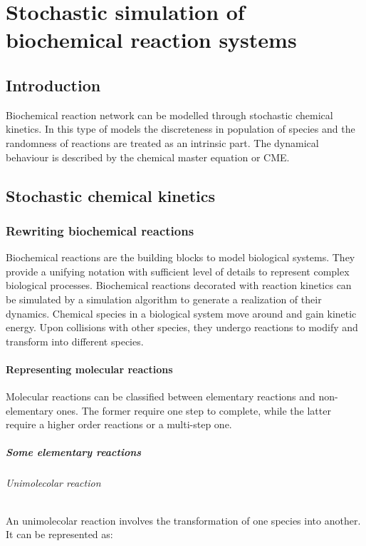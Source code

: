 \graphicspath{{chapters/02/images/}}
\chapter{Stochastic simulation of biochemical reaction systems}

\section{Introduction}
Biochemical reaction network can be modelled through stochastic chemical kinetics.
In this type of models the discreteness in population of species and the randomness of reactions are treated as an intrinsic part.
The dynamical behaviour is described by the chemical master equation or CME.

\section{Stochastic chemical kinetics}

  \subsection{Rewriting biochemical reactions}
  Biochemical reactions are the building blocks to model biological systems.
  They provide a unifying notation with sufficient level of details to represent complex biological processes.
  Biochemical reactions decorated with reaction kinetics can be simulated by a simulation algorithm to generate a realization of their dynamics.
  Chemical species in a biological system move around and gain kinetic energy.
  Upon collisions with other species, they undergo reactions to modify and transform into different species.

    \subsubsection{Representing molecular reactions}
    Molecular reactions can be classified between elementary reactions and non-elementary ones.
    The former require one step to complete, while the latter require a higher order reactions or a multi-step one.

      \paragraph{Some elementary reactions}

        \subparagraph{Unimolecolar reaction}
        An unimolecolar reaction involves the transformation of one species into another.
        It can be represented as:

